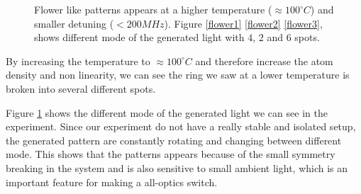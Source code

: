 \documentclass[aps,twocolumn,secnumarabic,balancelastpage,amsmath,amssymb,nofootinbib]{revtex4}
\begin{document}
\begin{figure}
  \caption{Flower like patterns appears at a higher temperature ($\approx100^\circ C$) and smaller detuning ($<200MHz$). Figure \ref{flower1} \ref{flower2} \ref{flower3}, shows different mode of the generated light with $4$, $2$ and $6$ spots.}
  \label{patterns}
\end{figure}

By increasing the temperature to $\approx100^\circ C$ and therefore increase the atom density and non linearity, we can see the ring we saw at a lower temperature is broken into several different spots.

Figure \ref{patterns} shows the different mode of the generated light we can see in the experiment. Since our experiment do not have a really stable and isolated setup, the generated pattern are constantly rotating and changing between different mode. This shows that the patterns appears because of the small symmetry breaking in the system and is also sensitive to small ambient light, which is an important feature for making a all-optics switch.
\end{document}
